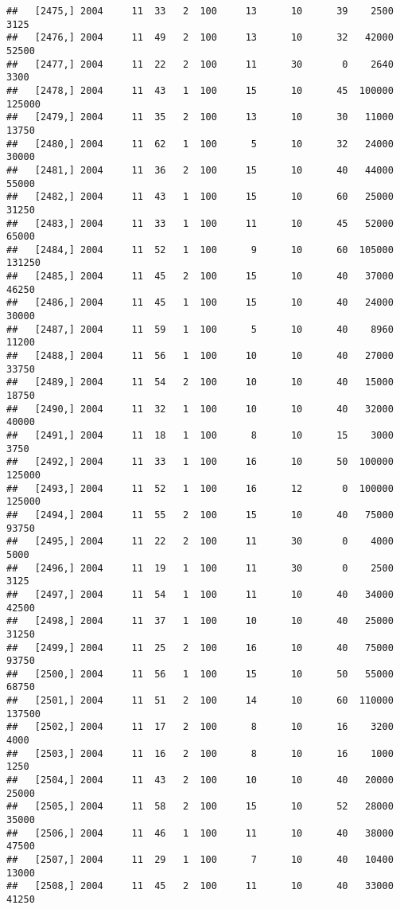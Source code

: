 \documentclass{article}\usepackage[]{graphicx}\usepackage[]{color}
\makeatletter
\newenvironment{kframe}{%
 \def\at@end@of@kframe{}%
 \ifinner\ifhmode%
  \def\at@end@of@kframe{\end{minipage}}%
  \begin{minipage}{\columnwidth}%
 \fi\fi%
 \def\FrameCommand##1{\hskip\@totalleftmargin \hskip-\fboxsep
 \colorbox{shadecolor}{##1}\hskip-\fboxsep
     \hskip-\linewidth \hskip-\@totalleftmargin \hskip\columnwidth}%
 \MakeFramed {\advance\hsize-\width
   \@totalleftmargin\z@ \linewidth\hsize
   \@setminipage}}%
 {\par\unskip\endMakeFramed%
 \at@end@of@kframe}
\newenvironment{knitrout}{}{} %
\makeatother
\begin{document}
\begin{knitrout}
\begin{kframe}
\begin{verbatim}
##   [2475,] 2004     11  33   2  100     13      10      39    2500    3125
##   [2476,] 2004     11  49   2  100     13      10      32   42000   52500
##   [2477,] 2004     11  22   2  100     11      30       0    2640    3300
##   [2478,] 2004     11  43   1  100     15      10      45  100000  125000
##   [2479,] 2004     11  35   2  100     13      10      30   11000   13750
##   [2480,] 2004     11  62   1  100      5      10      32   24000   30000
##   [2481,] 2004     11  36   2  100     15      10      40   44000   55000
##   [2482,] 2004     11  43   1  100     15      10      60   25000   31250
##   [2483,] 2004     11  33   1  100     11      10      45   52000   65000
##   [2484,] 2004     11  52   1  100      9      10      60  105000  131250
##   [2485,] 2004     11  45   2  100     15      10      40   37000   46250
##   [2486,] 2004     11  45   1  100     15      10      40   24000   30000
##   [2487,] 2004     11  59   1  100      5      10      40    8960   11200
##   [2488,] 2004     11  56   1  100     10      10      40   27000   33750
##   [2489,] 2004     11  54   2  100     10      10      40   15000   18750
##   [2490,] 2004     11  32   1  100     10      10      40   32000   40000
##   [2491,] 2004     11  18   1  100      8      10      15    3000    3750
##   [2492,] 2004     11  33   1  100     16      10      50  100000  125000
##   [2493,] 2004     11  52   1  100     16      12       0  100000  125000
##   [2494,] 2004     11  55   2  100     15      10      40   75000   93750
##   [2495,] 2004     11  22   2  100     11      30       0    4000    5000
##   [2496,] 2004     11  19   1  100     11      30       0    2500    3125
##   [2497,] 2004     11  54   1  100     11      10      40   34000   42500
##   [2498,] 2004     11  37   1  100     10      10      40   25000   31250
##   [2499,] 2004     11  25   2  100     16      10      40   75000   93750
##   [2500,] 2004     11  56   1  100     15      10      50   55000   68750
##   [2501,] 2004     11  51   2  100     14      10      60  110000  137500
##   [2502,] 2004     11  17   2  100      8      10      16    3200    4000
##   [2503,] 2004     11  16   2  100      8      10      16    1000    1250
##   [2504,] 2004     11  43   2  100     10      10      40   20000   25000
##   [2505,] 2004     11  58   2  100     15      10      52   28000   35000
##   [2506,] 2004     11  46   1  100     11      10      40   38000   47500
##   [2507,] 2004     11  29   1  100      7      10      40   10400   13000
##   [2508,] 2004     11  45   2  100     11      10      40   33000   41250

\end{verbatim}
\end{kframe}
\end{knitrout}
\end{document}
